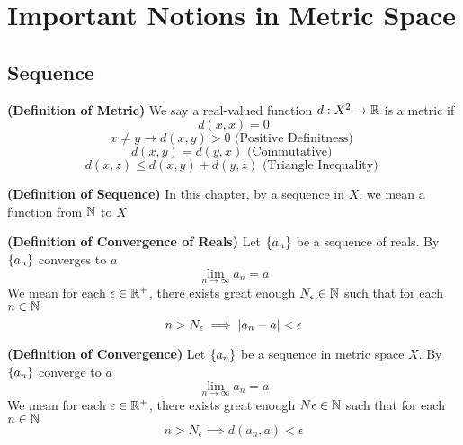 \documentclass{report}
\begin{document}
\chapter{Important Notions in Metric Space}
\section{Sequence}
\begin{definition}
\label{3.1.1}
\textbf{(Definition of Metric)} We say a real-valued function $d:X^2\rightarrow \mathbb{R}$ is a metric if
\begin{equation}
d(x,x)=0 
\end{equation}
\begin{equation}
x\neq y\longrightarrow d(x,y)>0\text{ (Positive Definitness) }
\end{equation}
\begin{equation}
d(x,y)=d(y,x)\text{ (Commutative) }
\end{equation}
\begin{equation}
d(x,z)\leq d(x,y)+d(y,z)\text{ (Triangle Inequality) }
\end{equation}
\end{definition}
\begin{definition}
\label{3.1.2}
\textbf{(Definition of Sequence)} In this chapter, by a sequence in $X$, we mean a function from  $\mathbb{N}$ to  $X$
\end{definition}
\begin{definition}
\label{3.1.3}
\textbf{(Definition of Convergence of Reals)} Let $\{ a_n \}$ be a sequence of reals. By $\{ a_n \}$ converges to $a$ 
\begin{equation}
\lim_{n\to\infty} a_n=a
\end{equation}
We mean for each $\epsilon \in\mathbb{R}^+$, there exists great enough $N_\epsilon \in\mathbb{N}$  such that for each $n\in\mathbb{N}$ 
\begin{equation}
n>N_\epsilon \implies |a_n-a|<\epsilon 
\end{equation}
\end{definition}
\begin{definition}
\label{3.1.4}
\textbf{(Definition of Convergence)} Let $\{ a_n \}$ be a sequence in metric space $X$. By $\{ a_n \}$ converge to $a$
\begin{equation}
\lim_{n\to\infty}a_n=a
\end{equation}
We mean for each $\epsilon \in\mathbb{R}^+$, there exists great enough $N\epsilon \in\mathbb{N}$ such that for each $n\in\mathbb{N}$
 \begin{equation}
n>N_\epsilon \implies d(a_n,a)<\epsilon 
\end{equation}
\end{definition}
\end{document}
